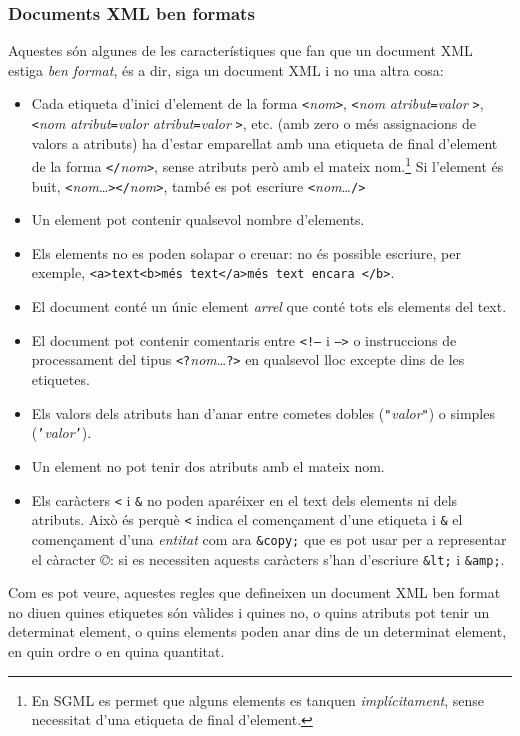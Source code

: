 
\subsubsection{Documents XML ben formats}

Aquestes són algunes de les característiques que fan que un document
XML estiga \emph{ben format}, és a dir, siga un document XML i no una
altra cosa:
\begin{itemize}
\item Cada etiqueta d'inici d'element de la forma
  \texttt{<}\emph{nom}\texttt{>}, \texttt{<}\emph{nom}
  \emph{atribut}\texttt{=}\emph{valor} \texttt{>},
  \texttt{<}\emph{nom} \emph{atribut}\texttt{=}\emph{valor}
  \emph{atribut}\texttt{=}\emph{valor} \texttt{>}, etc. (amb zero o
  més assignacions de valors a atributs) ha d'estar emparellat amb una
  etiqueta de final d'element de la forma
  \texttt{</}\emph{nom}\texttt{>}, sense atributs però amb el mateix
  nom.\footnote{En SGML es permet que alguns elements es tanquen
    \emph{implícitament}, sense necessitat d'una etiqueta de final
    d'element.} Si l'element és buit,
  \texttt{<}\emph{nom}\ldots\texttt{></}\emph{nom}\texttt{>}, també es
  pot escriure \texttt{<}\emph{nom}\ldots\texttt{/>}
\item Un element pot contenir qualsevol nombre d'elements.
\item Els elements no es poden solapar o creuar: no és possible
  escriure, per exemple, \texttt{<a>text<b>més text</a>més text encara
    </b>}.
\item El document conté un únic element \emph{arrel} que conté tots
  els elements del text.
\item El document pot contenir comentaris entre \texttt{<!--} i
  \texttt{-->} o instruccions de processament del tipus
  \texttt{<?}\emph{nom}\ldots\texttt{?>} en qualsevol lloc excepte dins
  de les etiquetes.
\item Els valors dels atributs han d'anar entre cometes dobles
  (\texttt{"}\emph{valor}\texttt{"}) o simples
  (\texttt{'}\emph{valor}\texttt{'}).
\item Un element no pot tenir dos atributs amb el mateix nom.
\item Els caràcters \texttt{<} i \texttt{\&} no poden aparéixer en el
  text dels elements ni dels atributs. Això és perquè \texttt{<}
  indica el començament d'une etiqueta i \texttt{\&} el començament
  d'una \emph{entitat} com ara \texttt{\&copy;} que es pot usar per a
  representar el càracter \emph{©}: si es necessiten aquests caràcters
  s'han d'escriure \texttt{\&lt;} i \texttt{\&amp;}.  
\end{itemize}
Com es pot veure, aquestes regles que defineixen un document XML ben
format no diuen quines etiquetes són vàlides i quines no, o quins
atributs pot tenir un determinat element, o quins elements poden anar
dins de un determinat element, en quin ordre o en quina
quantitat. 

